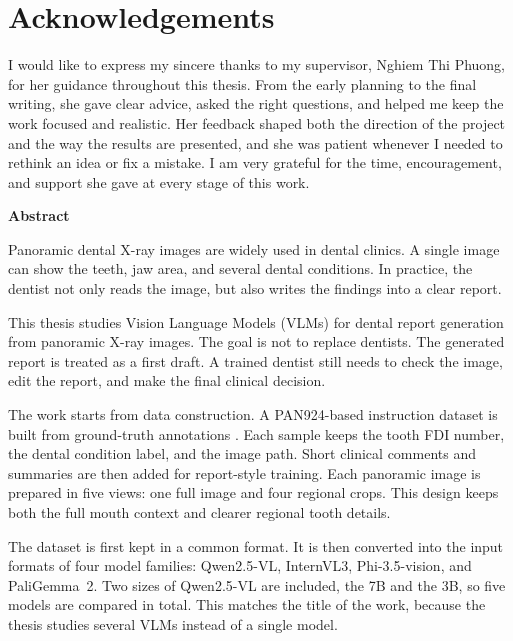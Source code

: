 \documentclass[a4paper,12pt]{report}
\begin{document}
\chapter*{Acknowledgements}
I would like to express my sincere thanks to my supervisor, Nghiem Thi Phuong, for her guidance throughout this thesis. From the early planning to the final writing, she gave clear advice, asked the right questions, and helped me keep the work focused and realistic. Her feedback shaped both the direction of the project and the way the results are presented, and she was patient whenever I needed to rethink an idea or fix a mistake. I am very grateful for the time, encouragement, and support she gave at every stage of this work.
\newpage



\begin{center}
    \textbf{\LARGE Abstract}

\end{center}

Panoramic dental X-ray images are widely used in dental clinics. A single image can show the teeth, jaw area, and several dental conditions. In practice, the dentist not only reads the image, but also writes the findings into a clear report.

This thesis studies Vision Language Models (VLMs) for dental report generation from panoramic X-ray images. The goal is not to replace dentists. The generated report is treated as a first draft. A trained dentist still needs to check the image, edit the report, and make the final clinical decision.

The work starts from data construction. A PAN924-based instruction dataset is built from ground-truth annotations \cite{inredd_pan924_2025}. Each sample keeps the tooth FDI number, the dental condition label, and the image path. Short clinical comments and summaries are then added for report-style training. Each panoramic image is prepared in five views: one full image and four regional crops. This design keeps both the full mouth context and clearer regional tooth details.

The dataset is first kept in a common format. It is then converted into the input formats of four model families: Qwen2.5-VL, InternVL3, Phi-3.5-vision, and PaliGemma~2. Two sizes of Qwen2.5-VL are included, the 7B and the 3B, so five models are compared in total. This matches the title of the work, because the thesis studies several VLMs instead of a single model.
\end{document}
